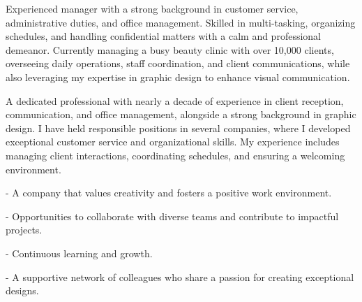 \documentclass[10pt,a4paper,ragged2e,withhyper]{altacv}
\begin{document}



\makecvheader


\begin{raggedright}
Experienced manager with a strong background in customer service, administrative duties, and office management. Skilled in multi-tasking, organizing schedules, and handling confidential matters with a calm and professional demeanor. Currently managing a busy beauty clinic with over 10,000 clients, overseeing daily operations, staff coordination, and client communications, while also leveraging my expertise in graphic design to enhance visual communication.
\end{raggedright}

\vspace{0.5cm}

\begin{paracol}{2}



    \begin{raggedright}
      A dedicated professional with nearly a decade of experience in client reception, communication, and office management, alongside a strong background in graphic design. I have held responsible positions in several companies, where I developed exceptional customer service and organizational skills. My experience includes managing client interactions, coordinating schedules, and ensuring a welcoming environment.
    \end{raggedright}
    
    
    \switchcolumn
    
    
    \begin{raggedright}

        - A company that values creativity and fosters a positive work environment.
        
        - Opportunities to collaborate with diverse teams and contribute to impactful projects.
        
        - Continuous learning and growth.
        
        - A supportive network of colleagues who share a passion for creating exceptional designs.
        
        
        \end{raggedright}

\end{paracol}
\end{document}
